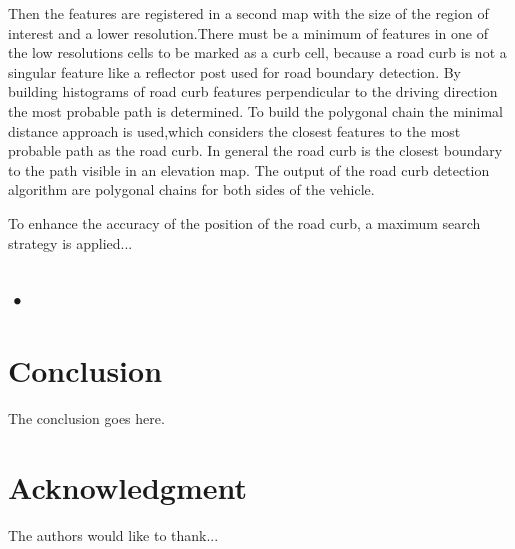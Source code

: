 \documentclass[conference]{IEEEtran}
\begin{document}
Then the features are registered in a second map with the size of the region of interest and a lower resolution.There must be a minimum of features in one of the low resolutions cells to be marked as a curb cell, because a road curb is not a singular feature like a reflector post used for road boundary detection. By building histograms of road curb features perpendicular to the driving direction the most probable path is determined. To build the polygonal chain the minimal distance approach is used,which considers the closest features to the most probable path as the road curb. In general the road curb is the closest boundary to the path visible in an elevation map. The output of the road curb detection algorithm are polygonal chains for both sides of the vehicle.

To enhance the accuracy of the position of the road curb, a maximum search strategy is applied...

\subsection{•} 
 
 
 
 
 
\section{Conclusion}
The conclusion goes here.
\nocite{*}

\section*{Acknowledgment}

The authors would like to thank...





\end{document}
